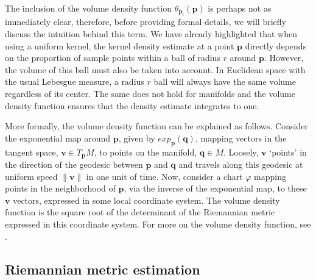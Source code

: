 \documentclass[11pt,a4paper,]{article}
\begin{document}
The inclusion of the volume density function \(\theta_{\pmb{p}_i}(\pmb{p})\) is perhaps not as immediately clear, therefore, before providing formal details, we will briefly discuss the intuition behind this term. We have already highlighted that when using a uniform kernel, the kernel density estimate at a point \(\pmb{p}\) directly depends on the proportion of sample points within a ball of radius \(r\) around \(\pmb{p}\). However, the volume of this ball must also be taken into account. In Euclidean space with the usual Lebesgue measure, a radius \(r\) ball will always have the same volume regardless of its center. The same does not hold for manifolds and the volume density function ensures that the density estimate integrates to one.

More formally, the volume density function can be explained as follows. Consider the exponential map around \(\pmb{p}\), given by \(exp_{\pmb{p}}(\pmb{q})\), mapping vectors in the tangent space, \(\pmb{v}\in T_{\pmb{p}}M\), to points on the manifold, \(\pmb{q}\in M\). Loosely, \(\pmb{v}\) `points' in the direction of the geodesic between \(\pmb{p}\) and \(\pmb{q}\) and travels along this geodesic at uniform speed \(\|\pmb{v}\|\) in one unit of time. Now, consider a chart \(\varphi\) mapping points in the neighborhood of \(\pmb{p}\), via the inverse of the exponential map, to these \(\pmb{v}\) vectors, expressed in some local coordinate system. The volume density function is the square root of the determinant of the Riemannian metric expressed in this coordinate system. For more on the volume density function, see \textcite{Le_Brigant2019-lj}.

\hypertarget{MetLearn}{%
\subsection{Riemannian metric estimation}\label{MetLearn}}
\end{document}
